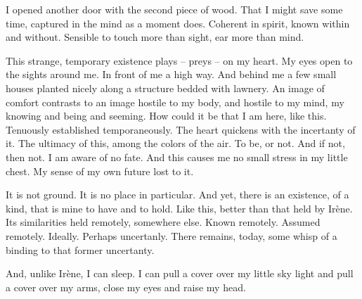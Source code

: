I opened another door with the second piece of wood.  That I might save some time, captured in the mind as a moment does.  Coherent in spirit, known within and without.  Sensible to touch more than sight, ear more than mind.


This strange, temporary existence plays -- preys -- on my heart.  My eyes open to the sights around me.  In front of me a high way.  And behind me a few small houses planted nicely along a structure bedded with lawnery.  An image of comfort contrasts to an image hostile to my body, and hostile to my mind, my knowing and being and seeming.  How could it be that I am here, like this.  Tenuously established temporaneously.  The heart quickens with the incertanty of it.  The ultimacy of this, among the colors of the air.  To be, or not.  And if not, then not.  I am aware of no fate.  And this causes me no small stress in my little chest.  My sense of my own future lost to it.


It is not ground.  It is no place in particular.  And yet, there is an existence, of a kind, that is mine to have and to hold.  Like this, better than that held by Irène.  Its similarities held remotely, somewhere else.  Known remotely.  Assumed remotely.  Ideally.  Perhaps uncertanly.  There remains, today, some whisp of a binding to that former uncertanty.


And, unlike Irène, I can sleep.  I can pull a cover over my  little sky light and pull a cover over my arms, close my eyes and raise my head.
\bye

